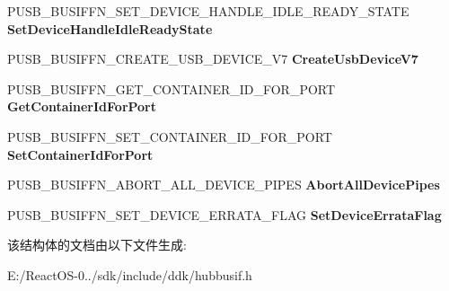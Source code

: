 \begin{DoxyCompactItemize}
\item 
\mbox{\label{struct___u_s_b___b_u_s___i_n_t_e_r_f_a_c_e___h_u_b___v7_a8fc9679d613a131d0b75f9615c10747d}} 
P\+U\+S\+B\+\_\+\+B\+U\+S\+I\+F\+F\+N\+\_\+\+S\+E\+T\+\_\+\+D\+E\+V\+I\+C\+E\+\_\+\+H\+A\+N\+D\+L\+E\+\_\+\+I\+D\+L\+E\+\_\+\+R\+E\+A\+D\+Y\+\_\+\+S\+T\+A\+TE {\bfseries Set\+Device\+Handle\+Idle\+Ready\+State}
\item 
\mbox{\label{struct___u_s_b___b_u_s___i_n_t_e_r_f_a_c_e___h_u_b___v7_ac938754c6db38e641e40c0ceca4b1268}} 
P\+U\+S\+B\+\_\+\+B\+U\+S\+I\+F\+F\+N\+\_\+\+C\+R\+E\+A\+T\+E\+\_\+\+U\+S\+B\+\_\+\+D\+E\+V\+I\+C\+E\+\_\+\+V7 {\bfseries Create\+Usb\+Device\+V7}
\item 
\mbox{\label{struct___u_s_b___b_u_s___i_n_t_e_r_f_a_c_e___h_u_b___v7_accea6f8c65fe37439a91f916d586ea4b}} 
P\+U\+S\+B\+\_\+\+B\+U\+S\+I\+F\+F\+N\+\_\+\+G\+E\+T\+\_\+\+C\+O\+N\+T\+A\+I\+N\+E\+R\+\_\+\+I\+D\+\_\+\+F\+O\+R\+\_\+\+P\+O\+RT {\bfseries Get\+Container\+Id\+For\+Port}
\item 
\mbox{\label{struct___u_s_b___b_u_s___i_n_t_e_r_f_a_c_e___h_u_b___v7_a3610593e1e8101508dff13cd32ec1c44}} 
P\+U\+S\+B\+\_\+\+B\+U\+S\+I\+F\+F\+N\+\_\+\+S\+E\+T\+\_\+\+C\+O\+N\+T\+A\+I\+N\+E\+R\+\_\+\+I\+D\+\_\+\+F\+O\+R\+\_\+\+P\+O\+RT {\bfseries Set\+Container\+Id\+For\+Port}
\item 
\mbox{\label{struct___u_s_b___b_u_s___i_n_t_e_r_f_a_c_e___h_u_b___v7_aa8609ffa67c3cd58af5e9b31c0ed4376}} 
P\+U\+S\+B\+\_\+\+B\+U\+S\+I\+F\+F\+N\+\_\+\+A\+B\+O\+R\+T\+\_\+\+A\+L\+L\+\_\+\+D\+E\+V\+I\+C\+E\+\_\+\+P\+I\+P\+ES {\bfseries Abort\+All\+Device\+Pipes}
\item 
\mbox{\label{struct___u_s_b___b_u_s___i_n_t_e_r_f_a_c_e___h_u_b___v7_a23a8a03cb7b619eac0552ba67ea84104}} 
P\+U\+S\+B\+\_\+\+B\+U\+S\+I\+F\+F\+N\+\_\+\+S\+E\+T\+\_\+\+D\+E\+V\+I\+C\+E\+\_\+\+E\+R\+R\+A\+T\+A\+\_\+\+F\+L\+AG {\bfseries Set\+Device\+Errata\+Flag}
\end{DoxyCompactItemize}


该结构体的文档由以下文件生成\+:\begin{DoxyCompactItemize}
\item 
E\+:/\+React\+O\+S-\/0../sdk/include/ddk/hubbusif.\+h\end{DoxyCompactItemize}
